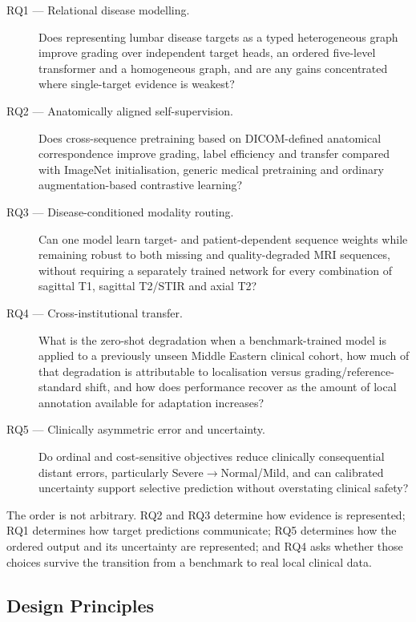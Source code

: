 \begin{description}
  \item[RQ1 --- Relational disease modelling.] Does representing lumbar disease
  targets as a typed heterogeneous graph improve grading over independent target
  heads, an ordered five-level transformer and a homogeneous graph, and are any
  gains concentrated where single-target evidence is weakest?

  \item[RQ2 --- Anatomically aligned self-supervision.] Does cross-sequence
  pretraining based on DICOM-defined anatomical correspondence improve grading,
  label efficiency and transfer compared with ImageNet initialisation, generic
  medical pretraining and ordinary augmentation-based contrastive learning?

  \item[RQ3 --- Disease-conditioned modality routing.] Can one model learn
  target- and patient-dependent sequence weights while remaining robust to
  both missing and quality-degraded MRI sequences, without requiring a
  separately trained network for every combination of sagittal T1, sagittal
  T2/STIR and axial T2?

  \item[RQ4 --- Cross-institutional transfer.] What is the zero-shot degradation
  when a benchmark-trained model is applied to a previously unseen Middle
  Eastern clinical cohort, how much of that degradation is attributable to
  localisation versus grading/reference-standard shift, and how does
  performance recover as the amount of local annotation available for
  adaptation increases?

  \item[RQ5 --- Clinically asymmetric error and uncertainty.] Do ordinal and
  cost-sensitive objectives reduce clinically consequential distant errors,
  particularly Severe$\rightarrow$Normal/Mild, and can calibrated uncertainty
  support selective prediction without overstating clinical safety?
\end{description}

The order is not arbitrary. RQ2 and RQ3 determine how evidence is represented;
RQ1 determines how target predictions communicate; RQ5 determines how the
ordered output and its uncertainty are represented; and RQ4 asks whether those
choices survive the transition from a benchmark to real local clinical data.

\subsection{Design Principles}
\label{sec:method-principles}

